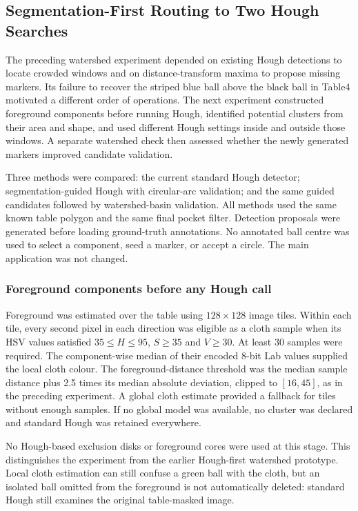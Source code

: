 \subsection{Segmentation-First Routing to Two Hough Searches}
\label{sec:segmentation-guided-hough}

The preceding watershed experiment depended on existing Hough detections to
locate crowded windows and on distance-transform maxima to propose missing
markers. Its failure to recover the striped blue ball above the black ball
in Table4 motivated a different order of operations. The next experiment
constructed foreground components before running Hough, identified potential
clusters from their area and shape, and used different Hough settings inside
and outside those windows. A separate watershed check then assessed whether
the newly generated markers improved candidate validation.

Three methods were compared: the current standard Hough detector;
segmentation-guided Hough with circular-arc validation; and the same guided
candidates followed by watershed-basin validation. All methods used the same
known table polygon and the same final pocket filter. Detection proposals
were generated before loading ground-truth annotations. No annotated ball
centre was used to select a component, seed a marker, or accept a circle.
The main application was not changed.

\subsubsection{Foreground components before any Hough call}

Foreground was estimated over the table using $128\times128$ image tiles.
Within each tile, every second pixel in each direction was eligible as a
cloth sample when its HSV values satisfied $35\leq H\leq95$,
$S\geq35$ and $V\geq30$. At least 30 samples were required. The
component-wise median of their encoded 8-bit Lab values supplied the local
cloth colour. The foreground-distance threshold was the median sample
distance plus 2.5 times its median absolute deviation, clipped to $[16,45]$,
as in the preceding experiment. A global cloth estimate provided a fallback
for tiles without enough samples. If no global model was available, no
cluster was declared and standard Hough was retained everywhere.

No Hough-based exclusion disks or foreground cores were used at this stage.
This distinguishes the experiment from the earlier Hough-first watershed
prototype. Local cloth estimation can still confuse a green ball with the
cloth, but an isolated ball omitted from the foreground is not automatically
deleted: standard Hough still examines the original table-masked image.

